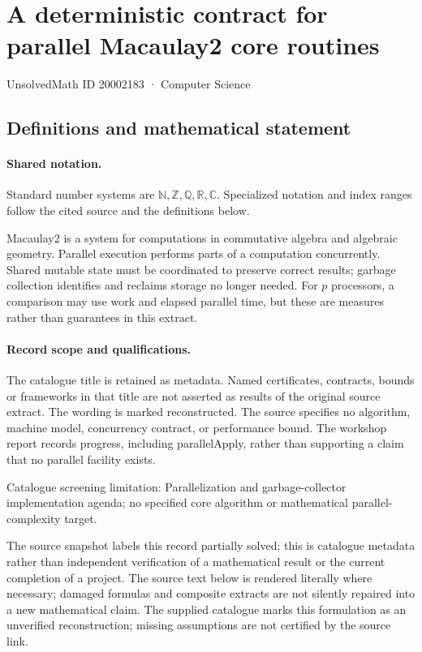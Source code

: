 \documentclass[11pt]{article}
\begin{document}
\setcounter{section}{20002182}
\section{A deterministic contract for parallel Macaulay2 core routines}\label{20002183}
{\small\sffamily UnsolvedMath ID 20002183 · Computer Science}
\subsection{Definitions and mathematical statement}

\paragraph{Shared notation.}Standard number systems are $\mathbb N,\mathbb Z,\mathbb Q,\mathbb R,\mathbb C$. Specialized notation and index ranges follow the cited source and the definitions below.


Macaulay2 is a system for computations in commutative algebra and algebraic geometry. Parallel execution performs parts of a computation concurrently. Shared mutable state must be coordinated to preserve correct results; garbage collection identifies and reclaims storage no longer needed. For $p$ processors, a comparison may use work and elapsed parallel time, but these are measures rather than guarantees in this extract.
\paragraph{Record scope and qualifications.}
The catalogue title is retained as metadata. Named certificates, contracts, bounds or frameworks in that title are not asserted as results of the original source extract.
The wording is marked reconstructed. The source specifies no algorithm, machine model, concurrency contract, or performance bound. The workshop report records progress, including parallelApply, rather than supporting a claim that no parallel facility exists.

Catalogue screening limitation: Parallelization and garbage-collector implementation agenda; no specified core algorithm or mathematical parallel-complexity target.

The source snapshot labels this record partially solved; this is catalogue metadata rather than independent verification of a mathematical result or the current completion of a project.
The source text below is rendered literally where necessary; damaged formulas and composite extracts are not silently repaired into a new mathematical claim.
The supplied catalogue marks this formulation as an unverified reconstruction; missing assumptions are not certified by the source link.
\end{document}

